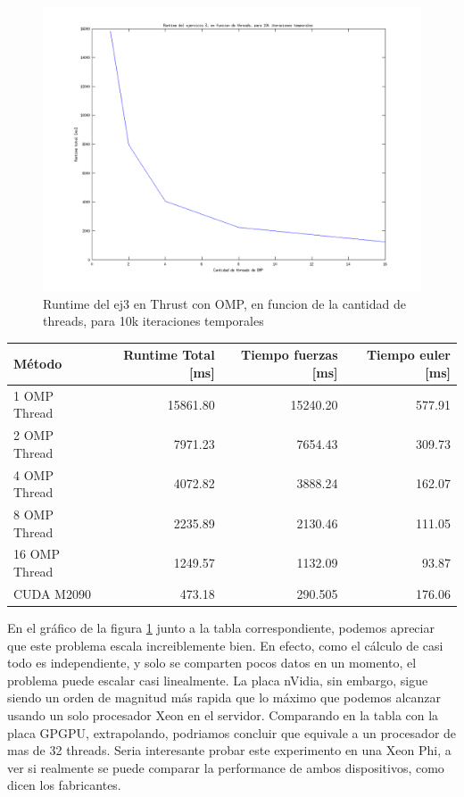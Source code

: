 \begin{figure}[H]
 \begin {center}
 \includegraphics[width=\hrwidth]{plots/ej3omp.png}
 \end {center}
 \caption{Runtime del ej3 en Thrust con OMP, en funcion de la cantidad de threads, para 10k iteraciones temporales}
 \label{fig:ej3OMP}
 \end{figure}

 \begin{table} [H]
    \begin{tabular}{l|r|r|r}
        \textbf{M\'etodo} & \textbf{ Runtime Total [ms]}& \textbf{Tiempo fuerzas [ms]} & \textbf{Tiempo euler [ms]}\\ \hline
        1 OMP Thread         & 15861.80      & 15240.20  & 577.91\\
   2 OMP Thread          & 7971.23     & 7654.43 &309.73  \\
   4 OMP Thread          & 4072.82     & 3888.24 & 162.07 \\
   8 OMP Thread  & 2235.89     & 2130.46 & 111.05 \\
   16 OMP Thread & 1249.57     & 1132.09 & 93.87 \\
       CUDA M2090 & 473.18  & 290.505 & 176.06
   \end{tabular}
   
\end{table}


En el gr\'afico de la figura \ref{fig:ej3OMP} junto a la tabla correspondiente, podemos apreciar que este problema escala
increiblemente bien. En efecto, como el c\'alculo de casi todo es independiente, y solo se comparten pocos datos en un momento,
el problema puede escalar casi linealmente. La placa nVidia, sin embargo, sigue siendo un orden de magnitud m\'as rapida que
lo m\'aximo que podemos alcanzar usando un solo procesador Xeon en el servidor.
Comparando en la tabla con la placa GPGPU, extrapolando, podriamos concluir que equivale a un procesador de mas de 32 threads. 
Seria interesante probar este experimento en una Xeon Phi, a ver si realmente se puede comparar la performance de ambos dispositivos,
como dicen los fabricantes.

